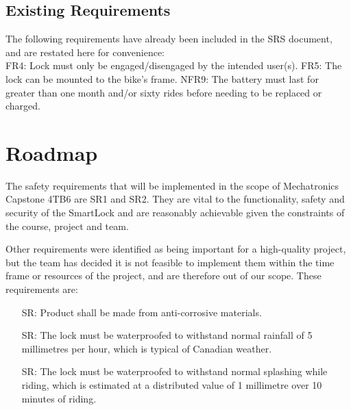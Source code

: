 \documentclass{article}
\newcounter{srnum} %
\begin{document}
\subsection{Existing Requirements}

The following requirements have already been included in the SRS document, and are restated here for convenience: \\

 \noindent FR4: Lock must only be engaged/disengaged by the intended user(s). \newline 
 FR5: The lock can be mounted to the bike's frame. \newline
 NFR9: The battery must last for greater than one month and/or sixty rides before needing to be replaced or charged. \\


\section{Roadmap}
The safety requirements that will be implemented in the scope of Mechatronics Capstone 4TB6 are SR1 and SR2. They are vital to the functionality, safety and security of the SmartLock and are reasonably achievable given the constraints of the course, project and team. 

Other requirements were identified as being important for a high-quality project, but the team has decided it is not feasible to implement them within the time frame or resources of the project, and are therefore out of our scope. These requirements are:

\begin{itemize}
\item[SR\refstepcounter{srnum}\thesrnum\label{SR3}:] Product shall be made from anti-corrosive materials. %
\item[SR\refstepcounter{srnum}\thesrnum\label{SR4}:] The lock must be waterproofed to withstand normal rainfall of 5 millimetres per hour, which is typical of Canadian weather. 
\item[SR\refstepcounter{srnum}\thesrnum\label{SR5}:] The lock must be waterproofed to withstand normal splashing while riding, which is estimated at a distributed value of 1 millimetre over 10 minutes of riding.
\end{itemize}

 
\end{document}
